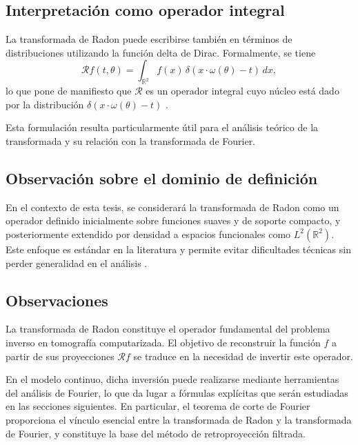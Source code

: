 \subsection*{Interpretación como operador integral}

La transformada de Radon puede escribirse también en términos de distribuciones utilizando la función delta de Dirac. Formalmente, se tiene
\[
\mathcal{R}f(t,\theta) = \int_{\mathbb{R}^{2}} f(x)\,\delta(x \cdot \omega(\theta) - t)\, dx,
\]
lo que pone de manifiesto que $\mathcal{R}$ es un operador integral cuyo núcleo está dado por la distribución $\delta(x \cdot \omega(\theta) - t)$ \cite{natterer2001,kuchment2014}.

Esta formulación resulta particularmente útil para el análisis teórico de la transformada y su relación con la transformada de Fourier.

\subsection*{Observación sobre el dominio de definición}

En el contexto de esta tesis, se considerará la transformada de Radon como un operador definido inicialmente sobre funciones suaves y de soporte compacto, y posteriormente extendido por densidad a espacios funcionales como $L^{2}(\mathbb{R}^{2})$. Este enfoque es estándar en la literatura y permite evitar dificultades técnicas sin perder generalidad en el análisis \cite{helgason2011}.

\subsection*{Observaciones}

La transformada de Radon constituye el operador fundamental del problema inverso en tomografía computarizada. El objetivo de reconstruir la función $f$ a partir de sus proyecciones $\mathcal{R}f$ se traduce en la necesidad de invertir este operador.

En el modelo continuo, dicha inversión puede realizarse mediante herramientas del análisis de Fourier, lo que da lugar a fórmulas explícitas que serán estudiadas en las secciones siguientes. En particular, el teorema de corte de Fourier proporciona el vínculo esencial entre la transformada de Radon y la transformada de Fourier, y constituye la base del método de retroproyección filtrada.